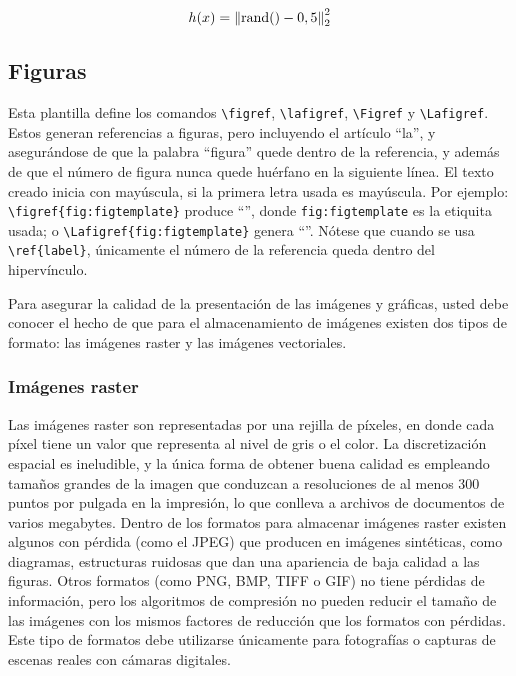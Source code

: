 \begin{equation}
  \label{eq:normrnd}
  h(x)=\left\lVert\operatorname{rand}()-0,5\right\rVert^2_2
\end{equation}

\subsection{Figuras}

Esta plantilla define los comandos \verb+\figref+, \verb+\lafigref+,
\verb+\Figref+ y \verb+\Lafigref+.  Estos generan referencias a
figuras, pero incluyendo el artículo ``la'', y asegurándose de que la
palabra ``figura'' quede dentro de la referencia, y además de que el
número de figura nunca quede huérfano en la siguiente línea.  El texto
creado inicia con mayúscula, si la primera letra usada es mayúscula.
Por ejemplo: \verb+\figref{fig:figtemplate}+ produce
``'', donde \verb+fig:figtemplate+ es la
etiquita usada; o \verb+\Lafigref{fig:figtemplate}+ genera
``''.  Nótese que cuando se usa
\verb+\ref{label}+, únicamente el número de la referencia queda dentro
del hipervínculo.

Para asegurar la calidad de la presentación de las imágenes y
gráficas, usted debe conocer el hecho de que para el almacenamiento de
imágenes existen dos tipos de formato: las imágenes raster y las
imágenes vectoriales.

\subsubsection{Imágenes raster}
Las imágenes raster son representadas por una rejilla de píxeles, en donde cada
píxel tiene un valor que representa al nivel de gris o el color. La
discretización espacial es ineludible, y la única forma de obtener buena
calidad es empleando tamaños grandes de la imagen que conduzcan a resoluciones
de al menos 300 puntos por pulgada en la impresión, lo que conlleva a archivos
de documentos de varios megabytes. Dentro de los formatos para almacenar
imágenes raster existen algunos con pérdida (como el JPEG) que producen en
imágenes sintéticas, como diagramas, estructuras ruidosas que dan una
apariencia de baja calidad a las figuras. Otros formatos (como PNG, BMP, TIFF o
GIF) no tiene pérdidas de información, pero los algoritmos de compresión no
pueden reducir el tamaño de las imágenes con los mismos factores de reducción
que los formatos con pérdidas. Este tipo de formatos debe utilizarse únicamente
para fotografías o capturas de escenas reales con cámaras digitales.

